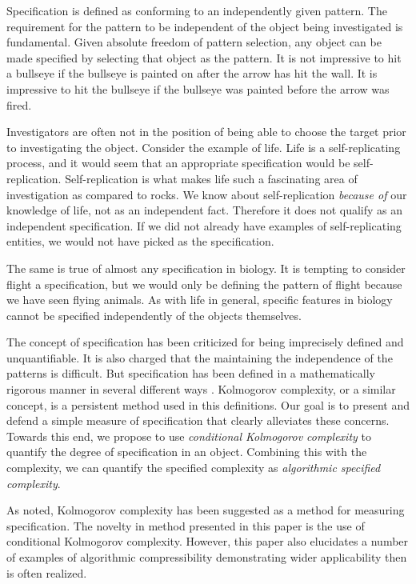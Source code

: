 Specification is defined as conforming to an independently given pattern.
The requirement for the pattern to be independent of the object being investigated is fundamental.
Given absolute freedom of pattern selection, any object can be made specified by selecting that object as the pattern.
It is not impressive to hit a bullseye if the bullseye is painted on after the arrow has hit the wall.
It is impressive to hit the bullseye if the bullseye was painted before the arrow was fired.

Investigators are often not in the position of being able to choose the target prior to investigating the object.
Consider the example of life.
Life is a self-replicating process, and it would seem that an appropriate specification would be self-replication.
Self-replication is what makes life such a fascinating area of investigation as compared to rocks.
We know about self-replication \emph{because of} our knowledge of life, not as an independent fact.
Therefore it does not qualify as an independent specification.
If we did not already have examples of self-replicating entities, we would not have picked as the specification.

The same is true of almost any specification in biology.
It is tempting to consider flight a specification, but we would only be defining the pattern of flight because we have seen flying animals.
As with life in general, specific features in biology cannot be specified independently of the objects themselves.

The concept of specification has been criticized for being imprecisely defined and unquantifiable.
It is also charged that the maintaining the independence of the patterns is difficult.
But specification has been defined in a mathematically rigorous manner in several different ways \cite{Dembski1998, Dembski2002, Dembski2005a}.
Kolmogorov complexity, or a similar concept, is a persistent method used in this definitions.
Our goal is to present and defend a simple measure of specification that clearly alleviates these concerns.
Towards this end, we propose to use \textit{conditional Kolmogorov complexity} to quantify the degree of specification in an object.
Combining this with the complexity, we can quantify the specified complexity as \textit{algorithmic specified complexity}.

As noted, Kolmogorov complexity has been suggested as a method for measuring specification.
The novelty in method presented in this paper is the use of conditional Kolmogorov complexity.
However, this paper also elucidates a number of examples of algorithmic compressibility demonstrating wider applicability then is often realized.

